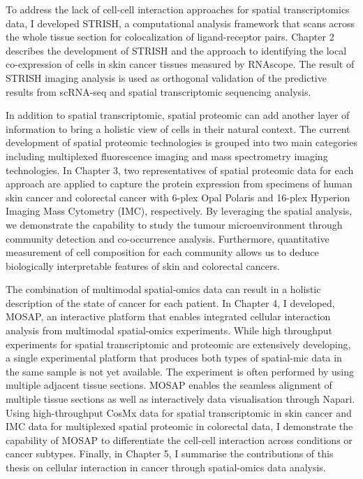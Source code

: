 To address the lack of cell-cell interaction approaches for spatial transcriptomics data, I developed STRISH, a computational analysis framework that scans across the whole tissue section for colocalization of ligand-receptor pairs.  Chapter 2 describes the development of STRISH and the approach to identifying the local co-expression of cells in skin cancer tissues measured by RNAscope. The result of STRISH imaging analysis is used as orthogonal validation of the predictive results from scRNA-seq and spatial transcriptomic sequencing analysis.

In addition to spatial transcriptomic, spatial proteomic can add another layer of information to bring a holistic view of cells in their natural context. The current development of spatial proteomic technologies is grouped into two main categories including multiplexed fluorescence imaging and mass spectrometry imaging technologies. In Chapter 3, two representatives of spatial proteomic data for each approach are applied to capture the protein expression from specimens of human skin cancer and colorectal cancer with 6-plex Opal Polaris and 16-plex Hyperion Imaging Mass Cytometry (IMC), respectively. By leveraging the spatial analysis, we demonstrate the capability to study the tumour microenvironment through community detection and co-occurrence analysis. Furthermore, quantitative measurement of cell composition for each community allows us to deduce biologically interpretable features of skin and colorectal cancers.  

The combination of multimodal spatial-omics data can result in a holistic description of the state of cancer for each patient.  In Chapter 4, I developed, MOSAP, an interactive platform that enables integrated cellular interaction analysis from multimodal spatial-omics experiments. While high throughput experiments for spatial transcriptomic and proteomic are extensively developing, a single experimental platform that produces both types of spatial-mic data in the same sample is not yet available. The experiment is often performed by using multiple adjacent tissue sections. MOSAP enables the seamless alignment of  multiple tissue sections as well as interactively data visualisation through Napari. Using high-throughput CosMx data for spatial transcriptomic in skin cancer and IMC data for multiplexed spatial proteomic in colorectal data, I demonstrate the capability of MOSAP to differentiate the cell-cell interaction across conditions or cancer subtypes. 
Finally, in Chapter 5, I summarise the contributions of this thesis on cellular interaction in cancer through spatial-omics data analysis.


%